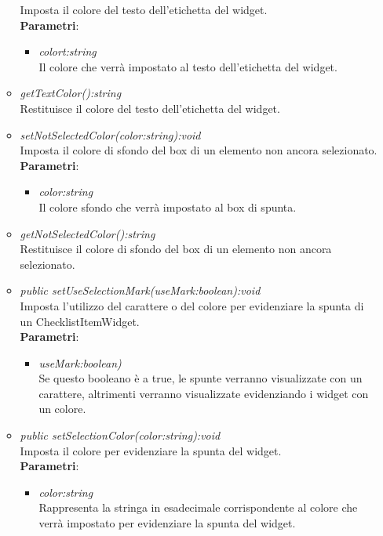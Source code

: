 \begin{itemize}
\begin{itemize}
		Imposta il colore del testo dell'etichetta del widget.
		\\ \textbf{Parametri}: \begin{itemize}
		\item \textit{colort:string}\\
		Il colore che verrà impostato al testo dell'etichetta del widget.
		\end{itemize}
		\item \textit{getTextColor():string}\\
		Restituisce il colore del testo dell'etichetta del widget.
		\item \textit{setNotSelectedColor(color:string):void}\\
		Imposta il colore di sfondo del box di un elemento non ancora selezionato.
		\\ \textbf{Parametri}: \begin{itemize}
		\item \textit{color:string}\\
		Il colore sfondo che verrà impostato al box di spunta.
		\end{itemize}
		\item \textit{getNotSelectedColor():string}\\
		Restituisce il colore di sfondo del box di un elemento non ancora selezionato.
	\item \textit{public setUseSelectionMark(useMark:boolean):void}\\
	Imposta l'utilizzo del carattere o del colore per evidenziare la spunta di un ChecklistItemWidget.
		\\ \textbf{Parametri}: \begin{itemize}
		\item \textit{useMark:boolean)}\\
		Se questo booleano è a true, le spunte verranno visualizzate con un carattere, altrimenti verranno visualizzate evidenziando i widget con un colore.
		\end{itemize} 
	\item \textit{public setSelectionColor(color:string):void}\\
	Imposta il colore per evidenziare la spunta del widget.
		\\ \textbf{Parametri}: \begin{itemize}
		\item \textit{color:string}\\
		Rappresenta la stringa in esadecimale corrispondente al colore che verrà impostato per evidenziare la spunta del widget.

\end{itemize}
\end{itemize}
\end{itemize}
